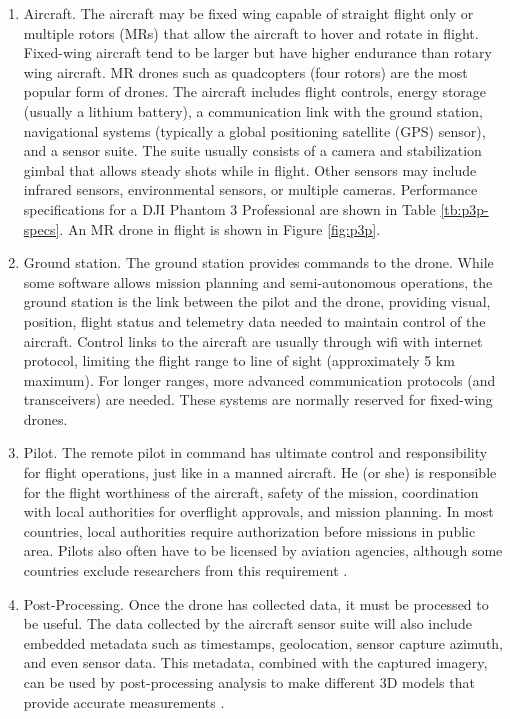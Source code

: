 \documentclass[preprint,12pt,a4paper]{elsarticle}
\begin{document}
\begin{linenumbers}
\begin{enumerate}
\item Aircraft. The aircraft may be fixed wing capable of straight flight only or multiple rotors (MRs) that allow the aircraft to hover and rotate in flight. Fixed-wing aircraft tend to be larger but have higher endurance than rotary wing aircraft. MR drones such as quadcopters (four rotors) are the most popular form of drones. The aircraft includes flight controls, energy storage (usually a lithium battery), a communication link with the ground station, navigational systems (typically a global positioning satellite (GPS) sensor), and a sensor suite. The suite usually consists of a camera and stabilization gimbal that allows steady shots while in flight. Other sensors may include infrared sensors, environmental sensors, or multiple cameras. Performance specifications for a DJI Phantom 3 Professional are shown in Table \ref{tb:p3p-specs}. An MR drone in flight is shown in Figure \ref{fig:p3p}.

\item Ground station. The ground station provides commands to the drone. While some software allows mission planning and semi-autonomous operations, the ground station is the link between the pilot and the drone, providing visual, position, flight status and telemetry data needed to maintain control of the aircraft. Control links to the aircraft are usually through wifi with internet protocol, limiting the flight range to line of sight (approximately 5 km maximum). For longer ranges, more advanced communication protocols (and transceivers) are needed. These systems are normally reserved for fixed-wing drones.

\item Pilot. The remote pilot in command has ultimate control and responsibility for flight operations, just like in a manned aircraft. He (or she) is responsible for the flight worthiness of the aircraft, safety of the mission, coordination with local authorities for overflight approvals, and mission planning. In most countries, local authorities require authorization before missions in public area. Pilots also often have to be licensed by aviation agencies, although some countries exclude researchers from this requirement \citep{UAVCoach2017}.

\item Post-Processing. Once the drone has collected data, it must be processed to be useful. The data collected by the aircraft sensor suite will also include embedded metadata such as timestamps, geolocation, sensor capture azimuth, and even sensor data. This metadata, combined with the captured imagery, can be used by post-processing analysis to make different 3D models that provide accurate measurements \citep{Sona2014}. 


\end{enumerate}
\end{linenumbers}
\end{document}
